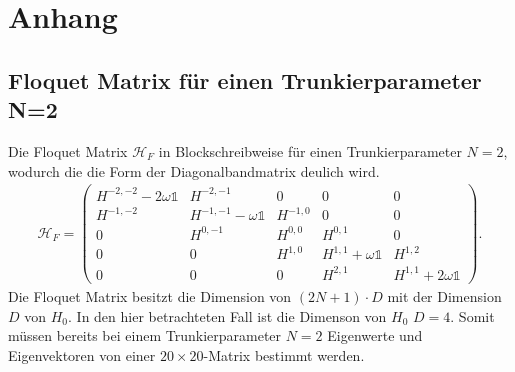 \chapter{Anhang}
\section{Floquet Matrix für einen Trunkierparameter N=2}
Die Floquet Matrix $\mathcal{H}_F$ in Blockschreibweise für einen Trunkierparameter $N=2$,
wodurch die die Form der Diagonalbandmatrix deulich wird.
\begin{align}
   \mathcal{H}_F=\begin{pmatrix}
H^{-2,-2}-2\omega\mathbb{1} &          H^{-2 ,-1}         &     0     &        0                  &     0  \\
H^{-1,-2}                   &  H^{-1,-1}-\omega\mathbb{1} &  H^{-1,0} &        0                  &     0   \\
 0                          &          H^{0,-1}           &  H^{0,0}  &       H^{0,1}             &     0  \\
 0                          &              0              &  H^{1,0}  &  H^{1,1}+\omega\mathbb{1} &  H^{1,2}\\
 0                          &              0              &     0     &        H^{2,1}            & H^{1,1}+2\omega\mathbb{1}
\end{pmatrix}.
\end{align}
Die Floquet Matrix besitzt die Dimension von $(2N+1)\cdot D$ mit der Dimension $D$ von $H_0$.
In den hier betrachteten Fall ist die Dimenson von $H_0$ $D=4$.
Somit müssen bereits bei einem Trunkierparameter $N=2$ Eigenwerte und Eigenvektoren
von einer $20\times20$-Matrix bestimmt werden.

\newpage
